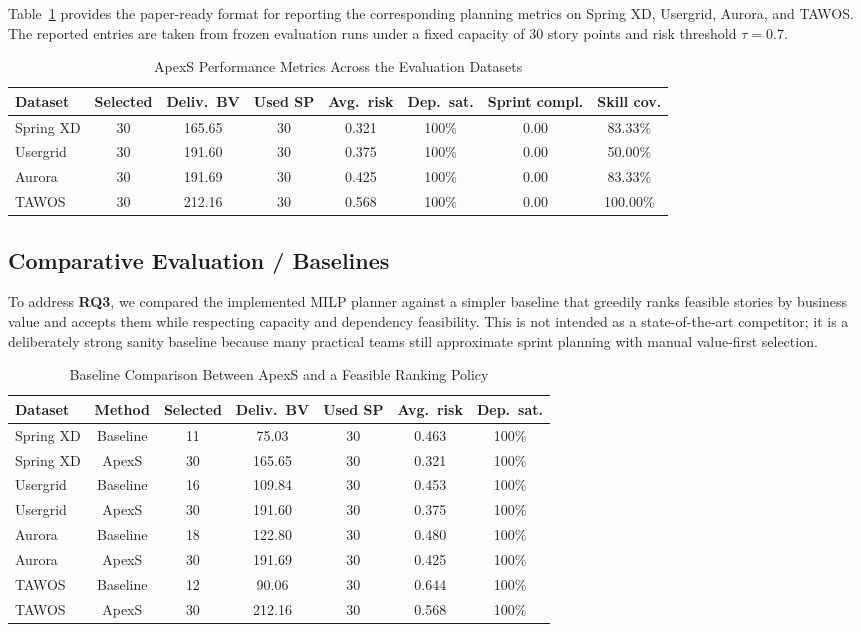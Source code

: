 \documentclass[conference]{IEEEtran}
\begin{document}
Table~\ref{tab:performance-metrics} provides the paper-ready format for reporting
the corresponding planning metrics on Spring XD, Usergrid, Aurora, and TAWOS.
The reported entries are taken from frozen evaluation runs under a fixed capacity
of 30 story points and risk threshold $\tau=0.7$.

\begin{table}[t]
\caption{ApexS Performance Metrics Across the Evaluation Datasets}
\label{tab:performance-metrics}
\centering\scriptsize
\begin{tabular}{lccccccc}
\toprule
Dataset & Selected & Deliv.\ BV & Used SP & Avg.\ risk & Dep.\ sat. & Sprint compl. & Skill cov. \\
\midrule
Spring XD & 30 & 165.65 & 30 & 0.321 & 100\% & 0.00 & 83.33\% \\
Usergrid  & 30 & 191.60 & 30 & 0.375 & 100\% & 0.00 & 50.00\% \\
Aurora    & 30 & 191.69 & 30 & 0.425 & 100\% & 0.00 & 83.33\% \\
TAWOS     & 30 & 212.16 & 30 & 0.568 & 100\% & 0.00 & 100.00\% \\
\bottomrule
\end{tabular}
\end{table}

\subsection{Comparative Evaluation / Baselines}

To address \textbf{RQ3}, we compared the implemented MILP planner against a simpler
baseline that greedily ranks feasible stories by business value and accepts them
while respecting capacity and dependency feasibility.
This is not intended as a state-of-the-art competitor; it is a deliberately strong
sanity baseline because many practical teams still approximate sprint planning with
manual value-first selection.

\begin{table}[t]
\caption{Baseline Comparison Between ApexS and a Feasible Ranking Policy}
\label{tab:baseline-comparison}
\centering\scriptsize
\begin{tabular}{lcccccc}
\toprule
Dataset & Method & Selected & Deliv.\ BV & Used SP & Avg.\ risk & Dep.\ sat. \\
\midrule
Spring XD & Baseline & 11 & 75.03  & 30 & 0.463 & 100\% \\
Spring XD & ApexS    & 30 & 165.65 & 30 & 0.321 & 100\% \\
Usergrid  & Baseline & 16 & 109.84 & 30 & 0.453 & 100\% \\
Usergrid  & ApexS    & 30 & 191.60 & 30 & 0.375 & 100\% \\
Aurora    & Baseline & 18 & 122.80 & 30 & 0.480 & 100\% \\
Aurora    & ApexS    & 30 & 191.69 & 30 & 0.425 & 100\% \\
TAWOS     & Baseline & 12 & 90.06  & 30 & 0.644 & 100\% \\
TAWOS     & ApexS    & 30 & 212.16 & 30 & 0.568 & 100\% \\
\bottomrule
\end{tabular}
\end{table}
\end{document}
